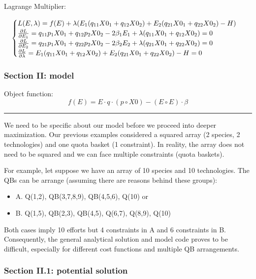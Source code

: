 \documentclass[
]{article}
\providecommand{\tightlist}{%
  \setlength{\itemsep}{0pt}\setlength{\parskip}{0pt}}
\begin{document}
Lagrange Multiplier:

\[\begin{cases}
L(E, \lambda) = f(E) + \lambda(E_1(q_{11}X0_1+q_{12}X0_2) + E_2(q_{21}X0_1+q_{22}X0_2) - H)\\
{\partial L \over \partial E_1} = q_{11}p_1X0_1+q_{12}p_2X0_2-2\beta_1E_1 + \lambda (q_{11}X0_1+q_{12}X0_2)=0\\
{\partial L \over \partial E_2} = q_{21}p_1X0_1+q_{22}p_2X0_2-2\beta_2E_2 + \lambda (q_{21}X0_1+q_{22}X0_2)=0\\
{\partial L \over \partial \lambda} = E_1(q_{11}X0_1+q_{12}X0_2) + E_2(q_{21}X0_1+q_{22}X0_2) - H = 0\\
\end{cases}
\]

\hypertarget{section-ii-model}{%
\subsubsection{Section II: model}\label{section-ii-model}}

Object function: \[
f(E) = E \cdot q \cdot (p \circ X0) - (E \circ E) \cdot \beta
\]

\begin{center}\rule{0.5\linewidth}{\linethickness}\end{center}

We need to be specific about our model before we proceed into deeper
maximization. Our previous examples considered a squared array (2
species, 2 technologies) and one quota basket (1 constraint). In
reality, the array does not need to be squared and we can face multiple
constraints (quota baskets).

For example, let suppose we have an array of 10 species and 10
technologies. The QBs can be arrange (assuming there are reasons behind
these groups):

\begin{itemize}
\tightlist
\item
  A. Q(1,2), QB(3,7,8,9), QB(4,5,6), Q(10) or 
\item
  B. Q(1,5), QB(2,3), QB(4,5), Q(6,7), Q(8,9), Q(10)
\end{itemize}

Both cases imply 10 efforts but 4 constraints in A and 6 constraints in
B. Consequently, the general analytical solution and model code proves
to be difficult, especially for different cost functions and multiple QB
arrangements.

\hypertarget{section-ii.1-potential-solution}{%
\subsubsection{Section II.1: potential
solution}\label{section-ii.1-potential-solution}}
\end{document}
